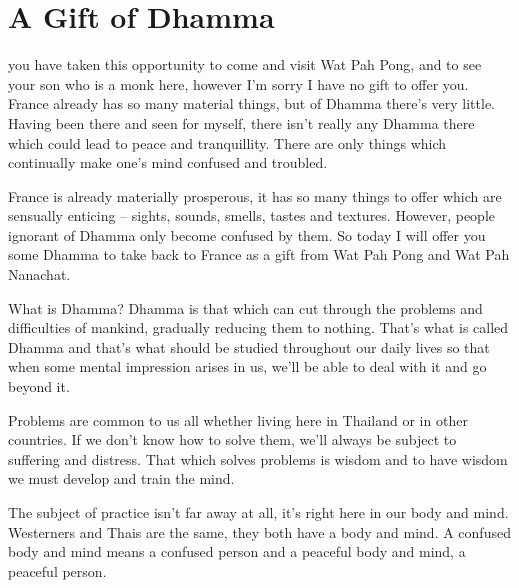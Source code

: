 
\chapter{A Gift of Dhamma}

\vspace*{1.5\baselineskip}
 you have taken this opportunity to come and visit Wat Pah Pong, and to see your son who is a monk here, however I'm sorry I have no gift to offer you. France already has so many material things, but of Dhamma there's very little. Having been there and seen for myself, there isn't really any Dhamma there which could lead to peace and tranquillity. There are only things which continually make one's mind confused and troubled.

France is already materially prosperous, it has so many things to offer which are sensually enticing -- sights, sounds, smells, tastes and textures. However, people ignorant of Dhamma only become confused by them. So today I will offer you some Dhamma to take back to France as a gift from Wat Pah Pong and Wat Pah Nanachat.

What is Dhamma? Dhamma is that which can cut through the problems and difficulties of mankind, gradually reducing them to nothing. That's what is called Dhamma and that's what should be studied throughout our daily lives so that when some mental impression arises in us, we'll be able to deal with it and go beyond it.

Problems are common to us all whether living here in Thailand or in other countries. If we don't know how to solve them, we'll always be subject to suffering and distress. That which solves problems is wisdom and to have wisdom we must develop and train the mind.

The subject of practice isn't far away at all, it's right here in our body and mind. Westerners and Thais are the same, they both have a body and mind. A confused body and mind means a confused person and a peaceful body and mind, a peaceful person.

